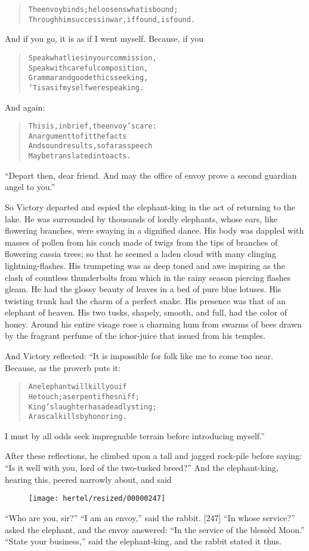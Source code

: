 \documentclass[article, twoside, 10pt]{memoir}
\renewenvironment{verbatim}{%
\begin{quote}%
\vskip -10pt%
\begin{alltt}\normalfont\small}{\end{alltt}%
\end{quote}%
\vskip -10pt
} %
\begin{document}
\begin{verbatim}
The envoy binds; he loosens what is bound;
Through him success in war, if found, is found.
\end{verbatim}
And if you go, it is as if I went myself. Because, if you

\begin{verbatim}
Speak what lies in your commission,
Speak with careful composition,
Grammar and good ethics seeking,
'Tis as if myself were speaking.
\end{verbatim}
And again:

\begin{verbatim}
This is, in brief, the envoy's care:
    An argument to fit the facts
And sound results, so far as speech
    May be translated into acts.
\end{verbatim}
``Depart then, dear friend. And may the office of envoy prove a second guardian angel to you.''

So Victory departed and espied the elephant-king in the act of
returning to the lake. He was surrounded by thousands of lordly
elephants, whose ears, like flowering branches, were swaying in a
dignified dance. His body was dappled with masses of pollen from
his couch made of twigs from the tips of branches of flowering
cassia trees; so that he seemed a laden cloud with many clinging
lightning-flashes. His trumpeting was as deep toned and awe
inspiring as the clash of countless thunderbolts from which in the
rainy season piercing flashes gleam. He had the glossy beauty of
leaves in a bed of pure blue lotuses. His twisting trunk had the
charm of a perfect snake. His presence was that of an elephant of
heaven. His two tusks, shapely, smooth, and full, had the color of
honey. Around his entire visage rose a charming hum from swarms of
bees drawn by the fragrant perfume of the ichor-juice that issued
from his temples.

And Victory reflected: “It is impossible for folk like me to come
too near. Because, as the proverb puts it:

\begin{verbatim}
An elephant will kill you if
He touch; a serpent if he sniff;
King's laughter has a deadly sting;
A rascal kills by honoring.
\end{verbatim}
I must by all odds seek impregnable terrain before introducing
myself.”

After these reflections, he climbed upon a tall and jagged
rock-pile before saying:
``Is it well with you, lord of the two-tusked breed?'' And the
elephant-king, hearing this, peered narrowly about, and said
\begin{figure}[p]\texttt{[image: hertel/resized/00000247]}\end{figure}``Who are you, sir?'' ``I am an envoy,'' said the rabbit. [247]
``In whose service?'' asked the elephant, and the envoy answered:
``In the service of the blessèd Moon.'' ``State your business,''
said the elephant-king, and the rabbit stated it thus.
\end{document}
